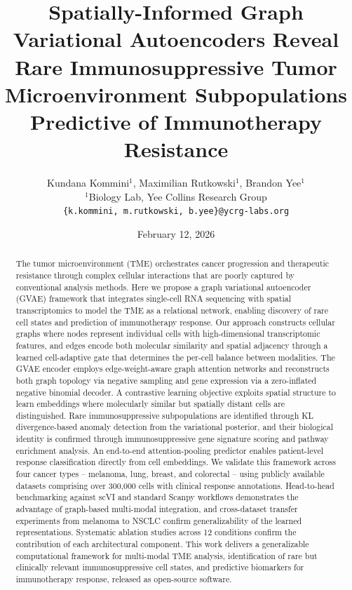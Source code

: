 \documentclass{article}
\title{Spatially-Informed Graph Variational Autoencoders Reveal Rare Immunosuppressive Tumor Microenvironment Subpopulations Predictive of Immunotherapy Resistance}
\author{
    Kundana Kommini$^{1}$, Maximilian Rutkowski$^{1}$, Brandon Yee$^{1}$\\
    $^{1}$Biology Lab, Yee Collins Research Group\\
    \texttt{\{k.kommini, m.rutkowski, b.yee\}@ycrg-labs.org}
}
\date{February 12, 2026}
\begin{document}
\maketitle

\begin{abstract}
The tumor microenvironment (TME) orchestrates cancer progression and therapeutic resistance through complex cellular interactions that are poorly captured by conventional analysis methods. Here we propose a graph variational autoencoder (GVAE) framework that integrates single-cell RNA sequencing with spatial transcriptomics to model the TME as a relational network, enabling discovery of rare cell states and prediction of immunotherapy response. Our approach constructs cellular graphs where nodes represent individual cells with high-dimensional transcriptomic features, and edges encode both molecular similarity and spatial adjacency through a learned cell-adaptive gate that determines the per-cell balance between modalities. The GVAE encoder employs edge-weight-aware graph attention networks and reconstructs both graph topology via negative sampling and gene expression via a zero-inflated negative binomial decoder. A contrastive learning objective exploits spatial structure to learn embeddings where molecularly similar but spatially distant cells are distinguished. Rare immunosuppressive subpopulations are identified through KL divergence-based anomaly detection from the variational posterior, and their biological identity is confirmed through immunosuppressive gene signature scoring and pathway enrichment analysis. An end-to-end attention-pooling predictor enables patient-level response classification directly from cell embeddings. We validate this framework across four cancer types -- melanoma, lung, breast, and colorectal -- using publicly available datasets comprising over 300,000 cells with clinical response annotations. Head-to-head benchmarking against scVI and standard Scanpy workflows demonstrates the advantage of graph-based multi-modal integration, and cross-dataset transfer experiments from melanoma to NSCLC confirm generalizability of the learned representations. Systematic ablation studies across 12 conditions confirm the contribution of each architectural component. This work delivers a generalizable computational framework for multi-modal TME analysis, identification of rare but clinically relevant immunosuppressive cell states, and predictive biomarkers for immunotherapy response, released as open-source software.
\end{abstract}
\end{document}
